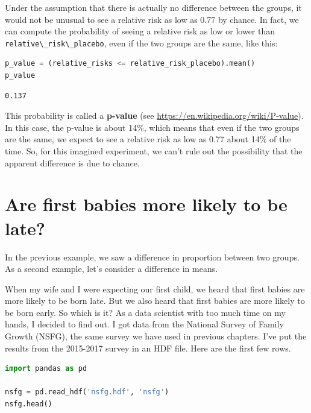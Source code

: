 Under the assumption that there is actually no difference between the
groups, it would not be unusual to see a relative risk as low as 0.77 by
chance. In fact, we can compute the probability of seeing a relative
risk as low or lower than
\passthrough{\lstinline!relative\_risk\_placebo!}, even if the two
groups are the same, like this:

\begin{lstlisting}[language=Python,style=source]
p_value = (relative_risks <= relative_risk_placebo).mean()
p_value
\end{lstlisting}

\begin{lstlisting}[style=output]
0.137
\end{lstlisting}

This probability is called a \textbf{p-value} (see
\url{https://en.wikipedia.org/wiki/P-value}). In this case, the p-value
is about 14\%, which means that even if the two groups are the same, we
expect to see a relative risk as low as 0.77 about 14\% of the time. So,
for this imagined experiment, we can't rule out the possibility that the
apparent difference is due to chance.

\hypertarget{are-first-babies-more-likely-to-be-late}{%
\section{Are first babies more likely to be
late?}\label{are-first-babies-more-likely-to-be-late}}

In the previous example, we saw a difference in proportion between two
groups. As a second example, let's consider a difference in means.

When my wife and I were expecting our first child, we heard that first
babies are more likely to be born late. But we also heard that first
babies are more likely to be born early. So which is it? As a data
scientist with too much time on my hands, I decided to find out. I got
data from the National Survey of Family Growth (NSFG), the same survey
we have used in previous chapters. I've put the results from the
2015-2017 survey in an HDF file. Here are the first few rows.

\begin{lstlisting}[language=Python,style=source]
import pandas as pd

nsfg = pd.read_hdf('nsfg.hdf', 'nsfg')
nsfg.head()
\end{lstlisting}

